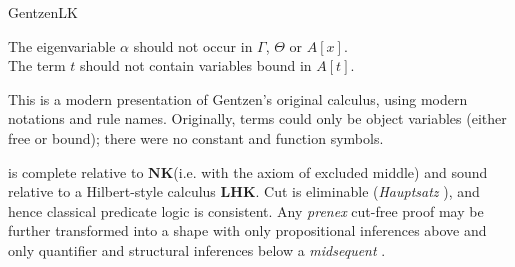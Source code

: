 \begin{entry}{GentzenLK}
\begin{calculus}
\centering
The eigenvariable $\alpha$ should not occur in $\Gamma$, $\Theta$ or $A[x]$. \\ 
The term $t$ should not contain variables bound in $A[t]$.
\end{calculus}


\begin{history}
This is a modern presentation of Gentzen's original \LK calculus\cite{lk:Gentzen1935}, using modern notations and rule names. Originally, terms could only be object variables (either free or bound); there were no constant and function symbols.
\end{history}

\newcommand{\LHK}{\ensuremath{\mathbf{LHK}}\xspace}
\newcommand{\NK}{\ensuremath{\mathbf{NK}}\xspace}


\begin{technicalities}
\LK is complete relative to \NK (i.e. \NJ {} with the axiom of excluded middle) and sound relative to a Hilbert-style calculus \LHK \cite{lk:Gentzen1935a}. Cut is eliminable (\emph{Hauptsatz} \cite{lk:Gentzen1935}), and hence classical predicate logic is consistent. Any \emph{prenex} cut-free proof may be further transformed into a shape with only propositional inferences above and only quantifier and structural inferences below a \emph{midsequent} \cite{lk:Gentzen1935a}.
\end{technicalities}

\end{entry}


